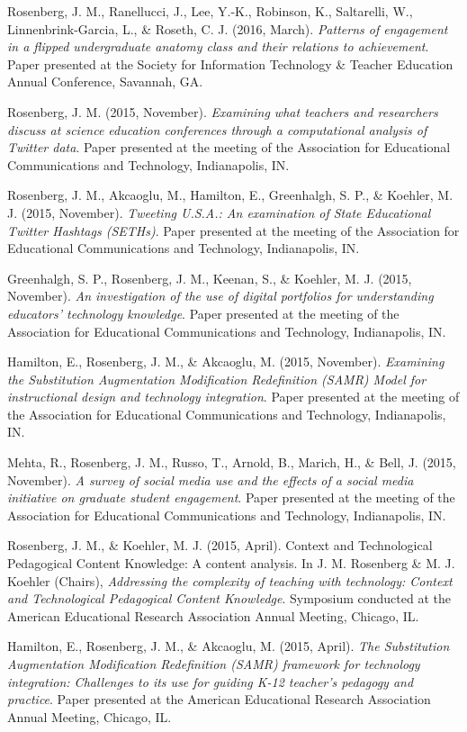 \documentclass[14,]{article}
\begin{document}
Rosenberg, J. M., Ranellucci, J., Lee, Y.-K., Robinson, K., Saltarelli,
W., Linnenbrink-Garcia, L., \& Roseth, C. J. (2016, March).
\emph{Patterns of engagement in a flipped undergraduate anatomy class
and their relations to achievement}. Paper presented at the Society for
Information Technology \& Teacher Education Annual Conference, Savannah,
GA.

Rosenberg, J. M. (2015, November). \emph{Examining what teachers and
researchers discuss at science education conferences through a
computational analysis of Twitter data}. Paper presented at the meeting
of the Association for Educational Communications and Technology,
Indianapolis, IN.

Rosenberg, J. M., Akcaoglu, M., Hamilton, E., Greenhalgh, S. P., \&
Koehler, M. J. (2015, November). \emph{Tweeting U.S.A.: An examination
of State Educational Twitter Hashtags (SETHs)}. Paper presented at the
meeting of the Association for Educational Communications and
Technology, Indianapolis, IN.

Greenhalgh, S. P., Rosenberg, J. M., Keenan, S., \& Koehler, M. J.
(2015, November). \emph{An investigation of the use of digital
portfolios for understanding educators' technology knowledge}. Paper
presented at the meeting of the Association for Educational
Communications and Technology, Indianapolis, IN.

Hamilton, E., Rosenberg, J. M., \& Akcaoglu, M. (2015, November).
\emph{Examining the Substitution Augmentation Modification Redefinition
(SAMR) Model for instructional design and technology integration}. Paper
presented at the meeting of the Association for Educational
Communications and Technology, Indianapolis, IN.

Mehta, R., Rosenberg, J. M., Russo, T., Arnold, B., Marich, H., \& Bell,
J. (2015, November). \emph{A survey of social media use and the effects
of a social media initiative on graduate student engagement}. Paper
presented at the meeting of the Association for Educational
Communications and Technology, Indianapolis, IN.

Rosenberg, J. M., \& Koehler, M. J. (2015, April). Context and
Technological Pedagogical Content Knowledge: A content analysis. In J.
M. Rosenberg \& M. J. Koehler (Chairs), \emph{Addressing the complexity
of teaching with technology: Context and Technological Pedagogical
Content Knowledge}. Symposium conducted at the American Educational
Research Association Annual Meeting, Chicago, IL.

Hamilton, E., Rosenberg, J. M., \& Akcaoglu, M. (2015, April). \emph{The
Substitution Augmentation Modification Redefinition (SAMR) framework for
technology integration: Challenges to its use for guiding K-12 teacher's
pedagogy and practice}. Paper presented at the American Educational
Research Association Annual Meeting, Chicago, IL.
\end{document}
